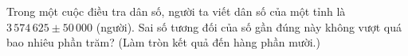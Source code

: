 \begin{ex}
Trong một cuộc điều tra dân số, người ta viết dân số của một tỉnh là $3\,574\,625\pm50\,000$ (người). Sai số tương đối của số gần đúng này không vượt quá bao nhiêu phần trăm? (Làm tròn kết quả đến hàng phần mười.)
\end{ex}
